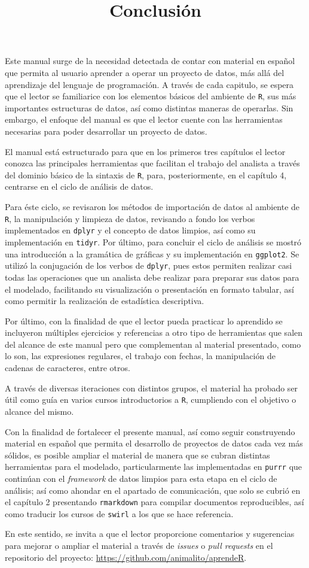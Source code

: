 \documentclass[]{article}
\title{Conclusión}
\author{}
\date{}
\begin{document}
Este manual surge de la necesidad detectada de contar con material en
español que permita al usuario aprender a operar un proyecto de datos,
más allá del aprendizaje del lenguaje de programación. A través de cada
capitulo, se espera que el lector se familiarice con los elementos
básicos del ambiente de \texttt{R}, sus más importantes estructuras de
datos, así como distintas maneras de operarlas. Sin embargo, el enfoque
del manual es que el lector cuente con las herramientas necesarias para
poder desarrollar un proyecto de datos.

El manual está estructurado para que en los primeros tres capítulos el
lector conozca las principales herramientas que facilitan el trabajo del
analista a través del dominio básico de la sintaxis de \texttt{R}, para,
posteriormente, en el capítulo 4, centrarse en el ciclo de análisis de
datos.

Para éste ciclo, se revisaron los métodos de importación de datos al
ambiente de \texttt{R}, la manipulación y limpieza de datos, revisando a
fondo los verbos implementados en \texttt{dplyr} y el concepto de datos
limpios, así como su implementación en \texttt{tidyr}. Por último, para
concluir el ciclo de análisis se mostró una introducción a la gramática
de gráficas y su implementación en \texttt{ggplot2}. Se utilizó la
conjugación de los verbos de \texttt{dplyr}, pues estos permiten
realizar casi todas las operaciones que un analista debe realizar para
preparar sus datos para el modelado, facilitando su visualización o
presentación en formato tabular, así como permitir la realización de
estadística descriptiva.

Por último, con la finalidad de que el lector pueda practicar lo
aprendido se incluyeron múltiples ejercicios y referencias a otro tipo
de herramientas que salen del alcance de este manual pero que
complementan al material presentado, como lo son, las expresiones
regulares, el trabajo con fechas, la manipulación de cadenas de
caracteres, entre otros.

A través de diversas iteraciones con distintos grupos, el material ha
probado ser útil como guía en varios cursos introductorios a \texttt{R},
cumpliendo con el objetivo o alcance del mismo.

Con la finalidad de fortalecer el presente manual, así como seguir
construyendo material en español que permita el desarrollo de proyectos
de datos cada vez más sólidos, es posible ampliar el material de manera
que se cubran distintas herramientas para el modelado, particularmente
las implementadas en \texttt{purrr} que continúan con el
\emph{framework} de datos limpios para esta etapa en el ciclo de
análisis; así como ahondar en el apartado de comunicación, que solo se
cubrió en el capítulo 2 presentando \texttt{rmarkdown} para compilar
documentos reproducibles, así como traducir los cursos de \texttt{swirl}
a los que se hace referencia.

En este sentido, se invita a que el lector proporcione comentarios y
sugerencias para mejorar o ampliar el material a través de \emph{issues}
o \emph{pull requests} en el repositorio del proyecto:
\url{https://github.com/animalito/aprendeR}.
\end{document}

